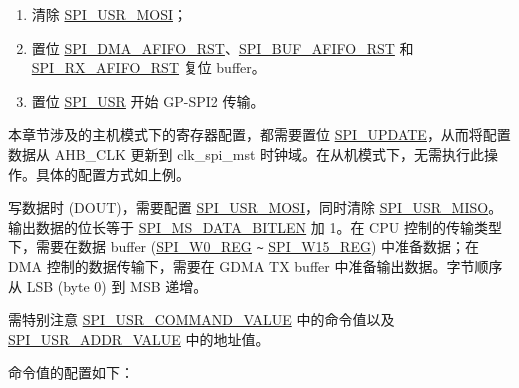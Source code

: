 \documentclass[main\_\_CN.tex]{subfiles}
\begin{document}
\begin{enumerate}
    \item 清除 \hyperref[fielddesc:SPIUSRMOSI]{SPI\_USR\_MOSI}；
    \item 置位 \hyperref[fielddesc:SPIDMAAFIFORST]{SPI\_DMA\_AFIFO\_RST}、\hyperref[fielddesc:SPIBUFAFIFORST]{SPI\_BUF\_AFIFO\_RST} 和 \hyperref[fielddesc:SPIRXAFIFORST]{SPI\_RX\_AFIFO\_RST} 复位 buffer。

    \item 置位 \hyperref[fielddesc:SPIUSR]{SPI\_USR} 开始 GP-SPI2 传输。
\end{enumerate}

\begin{tiplisting}
    本章节涉及的主机模式下的寄存器配置，都需要置位 \hyperref[fielddesc:SPIUPDATE]{SPI\_UPDATE}，从而将配置数据从 AHB\_CLK 更新到 clk\_spi\_mst 时钟域。在从机模式下，无需执行此操作。具体的配置方式如上例。
    \end{tiplisting}

写数据时 (DOUT)，需要配置 \hyperref[fielddesc:SPIUSRMOSI]{SPI\_USR\_MOSI}，同时清除 \hyperref[fielddesc:SPIUSRMISO]{SPI\_USR\_MISO}。输出数据的位长等于 \hyperref[fielddesc:SPIMSDATABITLEN]{SPI\_MS\_DATA\_BITLEN} 加 1。在 CPU 控制的传输类型下，需要在数据 buffer (\hyperref[regdesc:SPIW0REG]{SPI\_W0\_REG} \verb+~+ \hyperref[regdesc:SPIW0REG]{SPI\_W15\_REG}) 中准备数据；在 DMA 控制的数据传输下，需要在 GDMA TX buffer 中准备输出数据。字节顺序从 LSB (byte 0) 到 MSB 递增。

需特别注意 \hyperref[fielddesc:SPIUSRCOMMANDVALUE]{SPI\_USR\_COMMAND\_VALUE} 中的命令值以及 \hyperref[fielddesc:SPIUSRADDRVALUE]{SPI\_USR\_ADDR\_VALUE} 中的地址值。

命令值的配置如下：
\end{document}
